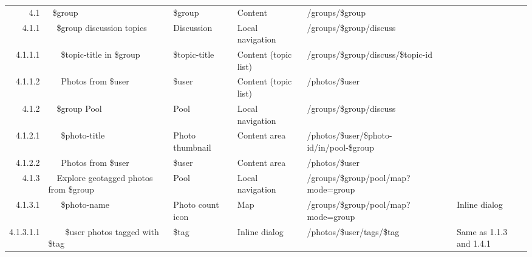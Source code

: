 \documentclass[12pt,a4paper]{article}
\begin{document}
\begin{landscape}
\begin{table}[h!b!p!]
\begin{center}
\begin{tiny}
\begin{tabular}{r|l|l|l|l|p{3cm}}
              4.1 &
              ~\$group &
              \$group &
              Content &
              /groups/\$group &
              \\

                4.1.1 &
                ~~\$group discussion topics &
                Discussion &
                Local navigation &
                /groups/\$group/discuss &
                \\

                  4.1.1.1 &
                  ~~~\$topic-title in \$group &
                  \$topic-title &
                  Content (topic list) &
                  /groups/\$group/discuss/\$topic-id &
                  \\

                  4.1.1.2 &
                  ~~~Photos from \$user &
                  \$user &
                  Content (topic list) &
                  /photos/\$user &
                  \\

                4.1.2 &
                ~~\$group Pool &
                Pool &
                Local navigation &
                /groups/\$group/discuss &
                \\

                  4.1.2.1 &
                  ~~~\$photo-title &
                  Photo thumbnail &
                  Content area &
                  /photos/\$user/\$photo-id/in/pool-\$group &
                  \\

                  4.1.2.2 &
                  ~~~Photos from \$user &
                  \$user &
                  Content area &
                  /photos/\$user &
                  \\

                4.1.3 &
                ~~Explore geotagged photos from \$group  &
                Pool &
                Local navigation &
                /groups/\$group/pool/map?mode=group &
                \\

                  4.1.3.1 &
                  ~~~\$photo-name &
                  Photo count icon &
                  Map &
                  /groups/\$group/pool/map?mode=group &
                  Inline dialog\\

                    4.1.3.1.1 &
                    ~~~~\$user photos tagged with \$tag &
                    \$tag &
                    Inline dialog &
                    /photos/\$user/tags/\$tag &
                    Same as 1.1.3 and 1.4.1\\


\end{tabular}
\end{tiny}
\end{center}
\end{table}
\end{landscape}
\end{document}
